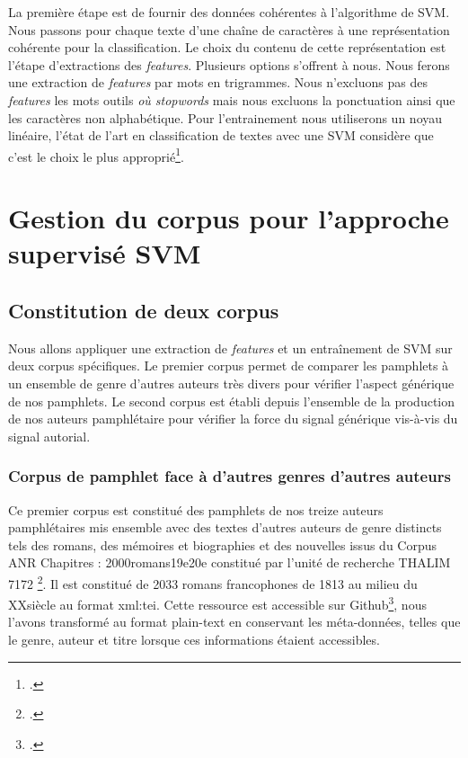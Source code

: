 La première étape est de fournir des données cohérentes à l'algorithme de SVM. Nous passons pour chaque texte d'une chaîne de caractères à une représentation cohérente pour la classification. Le choix du contenu de cette représentation est l'étape d'extractions des \textit{features}. Plusieurs options s'offrent à nous. Nous ferons une extraction de \textit{features} par mots en trigrammes. Nous n'excluons pas des \textit{features} les mots outils \textit{ où stopwords} mais nous excluons la ponctuation ainsi que les caractères non alphabétique. Pour l'entrainement nous utiliserons un noyau linéaire, l'état de l'art en classification de textes avec une SVM considère que c'est le choix le plus approprié\footcites{kowalczyk_linear_2014}.

\chapter{Gestion du corpus pour l'approche supervisé SVM}

\section{Constitution de deux corpus}

Nous allons appliquer une extraction de \textit{features} et un entraînement de SVM sur deux corpus spécifiques. Le premier corpus permet de comparer les pamphlets à un ensemble de genre d'autres auteurs très divers pour vérifier l'aspect générique de nos pamphlets. Le second corpus est établi depuis l'ensemble de la production de nos auteurs pamphlétaire pour vérifier la force du signal générique vis-à-vis du signal autorial.

\subsection{Corpus de pamphlet face à d'autres genres d'autres auteurs}

Ce premier corpus est constitué des pamphlets de nos treize auteurs pamphlétaires mis ensemble avec des textes d'autres auteurs de genre distincts tels des romans, des mémoires et biographies et des nouvelles issus du Corpus ANR Chapitres : 2000romans19e20e constitué par l'unité de recherche THALIM 7172 \footcites{anrchapitres_anrchapitres2000romans19e20e_2022}. Il est constitué de 2033 romans francophones de 1813 au milieu du XX\ieme siècle au format xml:tei. Cette ressource est accessible sur Github\footcites{anrchapitres_anrchapitres2000romans19e20e_2023}, nous l'avons transformé au format plain-text en conservant les méta-données, telles que le genre, auteur et titre lorsque ces informations étaient accessibles.


